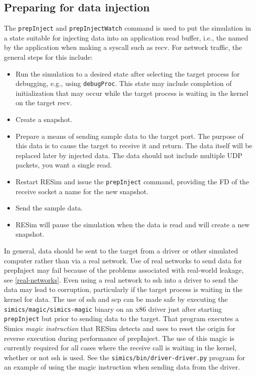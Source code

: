 \documentclass[titlepage]{article}
\begin{document}
\subsection{Preparing for data injection}
\label{prepInject}
The {\tt prepInject} and {\tt prepInjectWatch} command is used to put the simulation in a state suitable for injecting data into an application
read buffer, i.e., the named by the application when making a syscall such as recv.  For network traffic, the general steps for this include:
\begin{itemize}
\item Run the simulation to a desired state after selecting the target process for debugging, e.g., using {\tt debugProc}.  This state may include
completion of initialization that may occur while the target process is waiting in the kernel on the target recv.
\item Create a snapshot.
\item Prepare a means of sending sample data to the target port.  The purpose of this data is to cause the target to receive it and return.  The
data itself will be replaced later by injected data.  The data should not include multiple UDP packets, you want a single read.
\item Restart RESim and issue the {\tt prepInject} command, providing the FD of the receive socket a name for the new snapshot.
\item Send the sample data.
\item RESim will pause the simulation when the data is read and will create a new snapshot.
\end{itemize}
In general, data should be sent to the target from a driver or other simulated computer rather than via a real network.  Use of real networks to
send data for prepInject may fail because of the problems associated with real-world leakage, see \ref{real-networks}.
Even using a real network to ssh into a driver to send the data may lead to corruption, particularly if the target process is waiting in the 
kernel for data.  The use of ssh and scp can be made safe by executing the {\tt simics/magic/simics-magic} binary on an x86 driver just after
starting {\tt prepInject} but prior to sending data to the target.  That program executes a Simics \textit{magic instruction} that RESim 
detects and uses to reset the origin for reverse execution during performance of prepInject.  The use of this magic is currently required for all
cases where the receive call is waiting in the kernel, whether or not ssh is used.  See the {\tt simics/bin/driver-driver.py} program for an example
of using the magic instruction when sending data from the driver.
\end{document}
